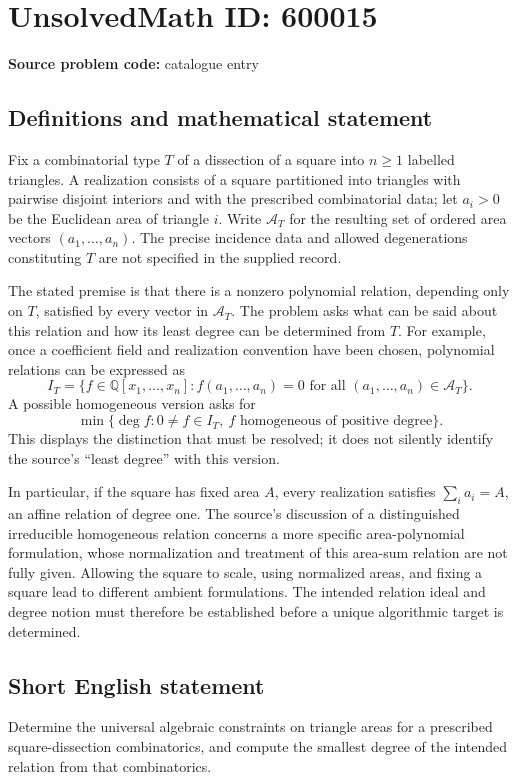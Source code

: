 \documentclass[11pt]{article}
\newcommand{\Q}{\mathbb{Q}}
\begin{document}
\section*{UnsolvedMath ID: 600015}
\textbf{Source problem code:} catalogue entry
\subsection{Definitions and mathematical statement}
Fix a combinatorial type $T$ of a dissection of a square into $n\geq1$ labelled triangles. A realization consists of a square partitioned into triangles with pairwise disjoint interiors and with the prescribed combinatorial data; let $a_i>0$ be the Euclidean area of triangle $i$. Write $\mathcal A_T$ for the resulting set of ordered area vectors $(a_1,\ldots,a_n)$. The precise incidence data and allowed degenerations constituting $T$ are not specified in the supplied record.

The stated premise is that there is a nonzero polynomial relation, depending only on $T$, satisfied by every vector in $\mathcal A_T$. The problem asks what can be said about this relation and how its least degree can be determined from $T$. For example, once a coefficient field and realization convention have been chosen, polynomial relations can be expressed as
\[
 I_T=\{f\in\Q[x_1,\ldots,x_n]: f(a_1,\ldots,a_n)=0
       \text{ for all }(a_1,\ldots,a_n)\in\mathcal A_T\}.
\]
A possible homogeneous version asks for
\[
 \min\{\deg f:0\ne f\in I_T,\ f\text{ homogeneous of positive degree}\}.
\]
This displays the distinction that must be resolved; it does not silently identify the source's ``least degree'' with this version.

In particular, if the square has fixed area $A$, every realization satisfies $\sum_i a_i=A$, an affine relation of degree one. The source's discussion of a distinguished irreducible homogeneous relation concerns a more specific area-polynomial formulation, whose normalization and treatment of this area-sum relation are not fully given. Allowing the square to scale, using normalized areas, and fixing a square lead to different ambient formulations. The intended relation ideal and degree notion must therefore be established before a unique algorithmic target is determined.
\subsection{Short English statement}
Determine the universal algebraic constraints on triangle areas for a prescribed square-dissection combinatorics, and compute the smallest degree of the intended relation from that combinatorics.
\end{document}
